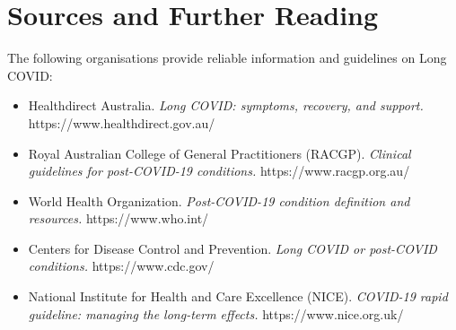 \section*{Sources and Further Reading}
The following organisations provide reliable information and guidelines on Long COVID:
\begin{itemize}
    \item Healthdirect Australia. \textit{Long COVID: symptoms, recovery, and support.} https://www.healthdirect.gov.au/
    \item Royal Australian College of General Practitioners (RACGP). \textit{Clinical guidelines for post-COVID-19 conditions.} https://www.racgp.org.au/
    \item World Health Organization. \textit{Post-COVID-19 condition definition and resources.} https://www.who.int/
    \item Centers for Disease Control and Prevention. \textit{Long COVID or post-COVID conditions.} https://www.cdc.gov/
    \item National Institute for Health and Care Excellence (NICE). \textit{COVID-19 rapid guideline: managing the long-term effects.} https://www.nice.org.uk/
\end{itemize}
